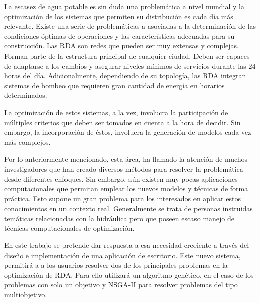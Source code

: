 \documentclass[11pt,letterpaper]{article}
\begin{document}
La escasez de agua potable es sin duda una problemática a nivel mundial y la optimización de los sistemas que permiten su distribución es cada día más relevante. Existe una serie de problemáticas a asociadas a la determinación de las condiciones óptimas de operaciones y las características adecuadas para su construcción.
Las RDA son redes que pueden ser muy extensas y complejas. Forman parte de la estructura principal de cualquier ciudad. Deben ser capaces de adaptarse a los cambios y asegurar niveles mínimos de servicios durante las 24 horas del día. Adicionalmente, dependiendo de su topología, las RDA integran sistemas de bombeo que requieren gran cantidad de energía en horarios determinados.

La optimización de estos sistemas, a la vez, involucra la participación de múltiples criterios que deben ser tomados en cuenta a la hora de decidir. Sin embargo, la incorporación de éstos, involucra la generación de modelos cada vez más complejos.

Por lo anteriormente mencionado, esta área, ha llamado la atención de muchos investigadores que han creado diversos métodos para resolver la problemática desde diferentes enfoques. Sin embargo, aún existen muy pocas aplicaciones computacionales que permitan emplear los nuevos modelos y técnicas de forma práctica. Esto supone un gran problema para los interesados en aplicar estos conocimientos en un contexto real. Generalmente se trata de personas instruidas temáticas relacionadas con la hidráulica pero que poseen escaso manejo de técnicas computacionales de optimización.

En este trabajo se pretende dar respuesta a esa necesidad creciente a través del diseño e implementación de una aplicación de escritorio. Este nuevo sistema, permitirá a a los usuarios resolver dos de los principales problemas en la optimización de RDA. Para ello utilizará un algoritmo genético, en el caso de los problemas con solo un objetivo y NSGA-II para resolver problemas del tipo multiobjetivo.




%

\end{document}
